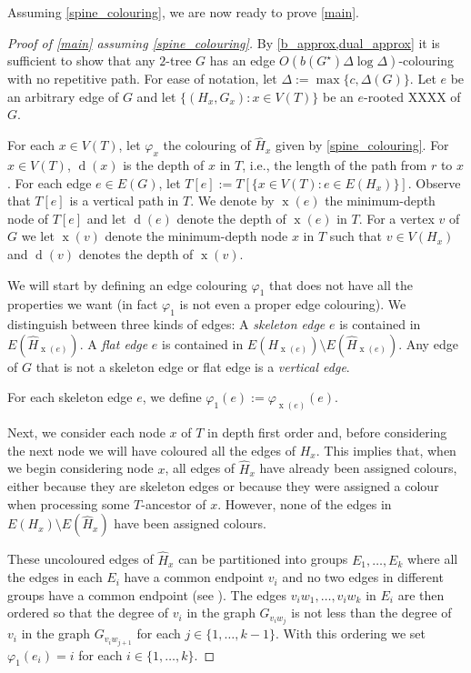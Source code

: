 \documentclass[kpfonts]{patmorin}
\DeclareMathOperator{\x}{x}
\DeclareMathOperator{\depth}{d}
\begin{document}
Assuming \cref{spine_colouring}, we are now ready to prove \cref{main}.

\begin{proof}[Proof of \cref{main} assuming \cref{spine_colouring}]
    By \cref{b_approx,dual_approx} it is sufficient to show that any $2$-tree $G$ has an edge $O(b(G^\star)\Delta\log\Delta)$-colouring with no repetitive path.  For ease of notation, let $\Delta:=\max\{c,\Delta(G)\}$.  Let $e$ be an arbitrary edge of $G$ and let
    $\{(H_x,G_x): x\in V(T)\}$ be an $e$-rooted XXXX of $G$.

    For each $x\in V(T)$, let $\varphi_x$ the colouring of $\hat{H}_x$ given by \cref{spine_colouring}. For $x\in V(T)$, $\depth(x)$ is the depth of $x$ in $T$, i.e., the length of the path from $r$ to $x$.  For each edge $e\in E(G)$, let $T[e]:=T[\{x\in V(T):e\in E(H_x)\}]$.  Observe that $T[e]$ is a vertical path in $T$.  We denote by $\x(e)$ the minimum-depth node of $T[e]$ and let $\depth(e)$ denote the depth of $\x(e)$ in $T$.  For a vertex $v$ of $G$ we let $\x(v)$ denote the minimum-depth node $x$ in $T$ such that $v\in V(H_x)$ and $\depth(v)$ denotes the depth of $\x(v)$.

    We will start by defining an edge colouring $\varphi_1$ that does not have all the properties we want (in fact $\varphi_1$ is not even a proper edge colouring).  We distinguish between three kinds of edges: A \emph{skeleton edge} $e$ is contained in $E(\hat{H}_{\x(e)})$.  A \emph{flat edge} $e$ is contained in $E(H_{\x(e)})\setminus E(\hat{H}_{\x(e)})$. Any edge of $G$ that is not a skeleton edge or flat edge is a \emph{vertical edge}.

    For each skeleton edge $e$, we define $\varphi_1(e):=\varphi_{\x(e)}(e)$.

    Next, we consider each node $x$ of $T$ in depth first order and, before considering the next node we will have coloured all the edges of $H_x$.  This implies that, when we begin considering node $x$, all edges of $\hat{H}_x$ have already been assigned colours, either because they are skeleton edges or because they were assigned a colour when processing some $T$-ancestor of $x$.  However, none of the edges in $E(H_x)\setminus E(\hat{H}_x)$ have been assigned colours.

    These uncoloured edges of $\hat{H}_x$ can be partitioned into groups $E_1,\ldots,E_k$ where all the edges in each $E_i$ have a common endpoint $v_i$ and no two edges in different groups have a common endpoint (see ).  The edges $v_iw_1,\ldots,v_iw_k$ in $E_i$ are then ordered so that the degree of $v_i$ in the graph $G_{v_iw_j}$ is not less than the degree of $v_i$ in the graph $G_{v_iw_{j+1}}$ for each $j\in\{1,\ldots,k-1\}$.  With this ordering we set $\varphi_1(e_i)=i$ for each $i\in\{1,\ldots,k\}$.


\end{proof}
\end{document}
